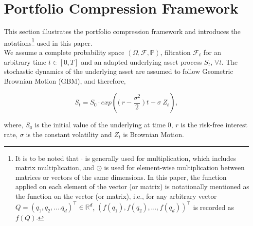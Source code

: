 \section{Portfolio Compression Framework}
\label{Portfolio Compression Framework}

\noindent This section illustrates the portfolio compression framework and introduces the notations\footnote{It is to be noted that $\cdot$ is generally used for multiplication, which includes matrix multiplication, and $\odot$ is used for element-wise multiplication between matrices or vectors of the same dimensions. In this paper, the function applied on each element of the vector (or matrix) is notationally mentioned as the function on the vector (or matrix), i.e., for any arbitrary vector $Q=(q_1, q_2, ....q_d)^{\intercal} \in \mathbb{R}^{d}$, $(f(q_1), f(q_2), ..., f(q_d))^{\intercal}$ is recorded as $f(Q)$.} used in this paper. \\

\noindent We assume a complete probability space $(\Omega, \mathcal{F}, \mathbb{P})$,  filtration $\mathcal{F}_t$ for an arbitrary time  $t \in [0,T]$ and an adapted underlying asset process $S_t$, $ \forall t$. The stochastic dynamics of the underlying asset are assumed to follow Geometric Brownian Motion (GBM), and therefore, 
 
\begin{equation}\label{GBMprocessPflCompression}
S_{t} = S_{0} \cdot  exp \left(  \Big( \ r - \frac{\sigma^2}{2} \ \Big) \ t + \sigma \ Z_{t} \right) , 
\end{equation} 

\noindent where, $S_{0}$ is the initial value of the underlying at time $0$, $r$ is the risk-free interest rate, $\sigma$ is the constant volatility and $Z_{t}$ is Brownian Motion. \\

